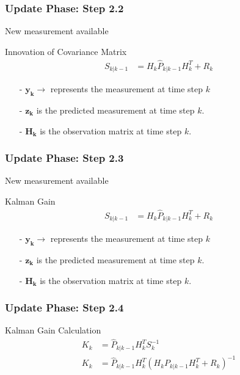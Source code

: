 \documentclass[aspectratio=169,hyperref={pdfpagelabels=false}]{beamer}
\begin{document}
\begin{frame}
  \frametitle{Update Phase: Step 2.2}
  New measurement available
  \begin{block}{Innovation of Covariance Matrix }
    \begin{align*}
      S_{k|k-1} &= H_{k}\hat{P}_{k|k-1}H_{k}^T + R_{k}
      \end{align*}
      \begin{itemize}
        \item[-] $\mathbf{y_k} \rightarrow$ represents the measurement at time step $k$
        \item[-] $\mathbf{z_k}$ is the predicted measurement at time step $k$.
        \item[-] $\mathbf{H_k}$ is the observation matrix at time step $k$.
      \end{itemize}
  \end{block}
\end{frame}


\begin{frame}
  \frametitle{Update Phase: Step 2.3}
  New measurement available
  \begin{block}{Kalman Gain}
    \begin{align*}
      S_{k|k-1} &= H_{k}\hat{P}_{k|k-1}H_{k}^T + R_{k}
      \end{align*}
      \begin{itemize}
        \item[-] $\mathbf{y_k} \rightarrow$ represents the measurement at time step $k$
        \item[-] $\mathbf{z_k}$ is the predicted measurement at time step $k$.
        \item[-] $\mathbf{H_k}$ is the observation matrix at time step $k$.
      \end{itemize}
  \end{block}
\end{frame}



\begin{frame}
\frametitle{Update Phase: Step 2.4}
    \begin{block}{Kalman Gain Calculation}
      \begin{align*}
        K_{k} &= \hat{P}_{k|k-1}H_{k}^T S_{k}^{-1} \\
        K_{k} &= \hat{P}_{k|k-1}H_{k}^T(H_{k}P_{k|k-1}H_{k}^T + R_{k})^{-1}
        \end{align*}        
    \end{block}

\end{frame}
\end{document}
